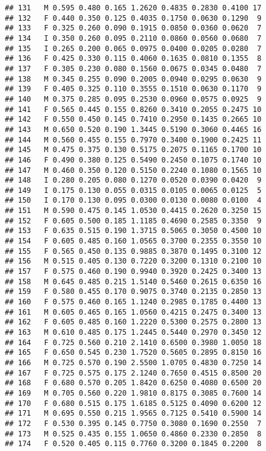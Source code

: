 \documentclass[
]{article}
\begin{document}
\begin{verbatim}
## 131   M 0.595 0.480 0.165 1.2620 0.4835 0.2830 0.4100 17
## 132   F 0.440 0.350 0.125 0.4035 0.1750 0.0630 0.1290  9
## 133   F 0.325 0.260 0.090 0.1915 0.0850 0.0360 0.0620  7
## 134   I 0.350 0.260 0.095 0.2110 0.0860 0.0560 0.0680  7
## 135   I 0.265 0.200 0.065 0.0975 0.0400 0.0205 0.0280  7
## 136   F 0.425 0.330 0.115 0.4060 0.1635 0.0810 0.1355  8
## 137   F 0.305 0.230 0.080 0.1560 0.0675 0.0345 0.0480  7
## 138   M 0.345 0.255 0.090 0.2005 0.0940 0.0295 0.0630  9
## 139   F 0.405 0.325 0.110 0.3555 0.1510 0.0630 0.1170  9
## 140   M 0.375 0.285 0.095 0.2530 0.0960 0.0575 0.0925  9
## 141   F 0.565 0.445 0.155 0.8260 0.3410 0.2055 0.2475 10
## 142   F 0.550 0.450 0.145 0.7410 0.2950 0.1435 0.2665 10
## 143   M 0.650 0.520 0.190 1.3445 0.5190 0.3060 0.4465 16
## 144   M 0.560 0.455 0.155 0.7970 0.3400 0.1900 0.2425 11
## 145   M 0.475 0.375 0.130 0.5175 0.2075 0.1165 0.1700 10
## 146   F 0.490 0.380 0.125 0.5490 0.2450 0.1075 0.1740 10
## 147   M 0.460 0.350 0.120 0.5150 0.2240 0.1080 0.1565 10
## 148   I 0.280 0.205 0.080 0.1270 0.0520 0.0390 0.0420  9
## 149   I 0.175 0.130 0.055 0.0315 0.0105 0.0065 0.0125  5
## 150   I 0.170 0.130 0.095 0.0300 0.0130 0.0080 0.0100  4
## 151   M 0.590 0.475 0.145 1.0530 0.4415 0.2620 0.3250 15
## 152   F 0.605 0.500 0.185 1.1185 0.4690 0.2585 0.3350  9
## 153   F 0.635 0.515 0.190 1.3715 0.5065 0.3050 0.4500 10
## 154   F 0.605 0.485 0.160 1.0565 0.3700 0.2355 0.3550 10
## 155   F 0.565 0.450 0.135 0.9885 0.3870 0.1495 0.3100 12
## 156   M 0.515 0.405 0.130 0.7220 0.3200 0.1310 0.2100 10
## 157   F 0.575 0.460 0.190 0.9940 0.3920 0.2425 0.3400 13
## 158   M 0.645 0.485 0.215 1.5140 0.5460 0.2615 0.6350 16
## 159   F 0.580 0.455 0.170 0.9075 0.3740 0.2135 0.2850 13
## 160   F 0.575 0.460 0.165 1.1240 0.2985 0.1785 0.4400 13
## 161   M 0.605 0.465 0.165 1.0560 0.4215 0.2475 0.3400 13
## 162   F 0.605 0.485 0.160 1.2220 0.5300 0.2575 0.2800 13
## 163   M 0.610 0.485 0.175 1.2445 0.5440 0.2970 0.3450 12
## 164   F 0.725 0.560 0.210 2.1410 0.6500 0.3980 1.0050 18
## 165   F 0.650 0.545 0.230 1.7520 0.5605 0.2895 0.8150 16
## 166   M 0.725 0.570 0.190 2.5500 1.0705 0.4830 0.7250 14
## 167   F 0.725 0.575 0.175 2.1240 0.7650 0.4515 0.8500 20
## 168   F 0.680 0.570 0.205 1.8420 0.6250 0.4080 0.6500 20
## 169   M 0.705 0.560 0.220 1.9810 0.8175 0.3085 0.7600 14
## 170   F 0.680 0.515 0.175 1.6185 0.5125 0.4090 0.6200 12
## 171   M 0.695 0.550 0.215 1.9565 0.7125 0.5410 0.5900 14
## 172   F 0.530 0.395 0.145 0.7750 0.3080 0.1690 0.2550  7
## 173   M 0.525 0.435 0.155 1.0650 0.4860 0.2330 0.2850  8
## 174   F 0.520 0.405 0.115 0.7760 0.3200 0.1845 0.2200  8

\end{verbatim}
\end{document}
